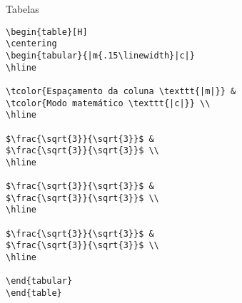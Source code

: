 \begin{task}{Tabelas}
\begin{verbatim}
\begin{table}[H]
\centering
\begin{tabular}{|m{.15\linewidth}|c|}
\hline

\tcolor{Espaçamento da coluna \texttt{|m|}} & 
\tcolor{Modo matemático \texttt{|c|}} \\
\hline

$\frac{\sqrt{3}}{\sqrt{3}}$ & 
$\frac{\sqrt{3}}{\sqrt{3}}$ \\
\hline

$\frac{\sqrt{3}}{\sqrt{3}}$ & 
$\frac{\sqrt{3}}{\sqrt{3}}$ \\
\hline

$\frac{\sqrt{3}}{\sqrt{3}}$ & 
$\frac{\sqrt{3}}{\sqrt{3}}$ \\
\hline

\end{tabular}
\end{table}
\end{verbatim}

\end{task}




